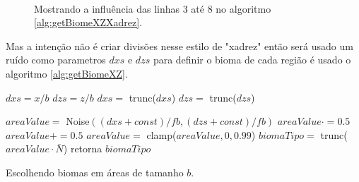  
\begin{figure}[H]
     \centering
     \hspace{0.1cm}
     \\
     
     \caption{Mostrando a influência das linhas 3 até 8 no algoritmo \ref{alg:getBiomeXZXadrez}.}
     
     \label{fig:ssxadrez}
\end{figure}

Mas a intenção não é criar divisões nesse estilo de "xadrez" então será usado um 
ruído como parametros $dxs$ e $dzs$ para definir o bioma de cada região é usado
o algoritmo \ref{alg:getBiomeXZ}.

\begin{algorithm}[H]\label{alg:getBiomeXZ}
    $dxs = x/b$\;
    $dzs = z/b$\;
    $dxs =$ trunc($dxs$)\;
    $dzs =$ trunc($dzs$)\;
    
    $areaValue =$ Noise$((dxs + const)/fb, (dzs + const)/fb)$\;
    $areaValue \cdot = 0.5$\;
    $areaValue += 0.5$\;
    $areaValue =$ clamp($areaValue, 0, 0.99$)\;
    $biomaTipo =$ trunc($areaValue \cdot \bar{N}$)\;
    retorna $biomaTipo$\;
    \caption{Escolhendo biomas em áreas de tamanho $b$.}
\end{algorithm}

